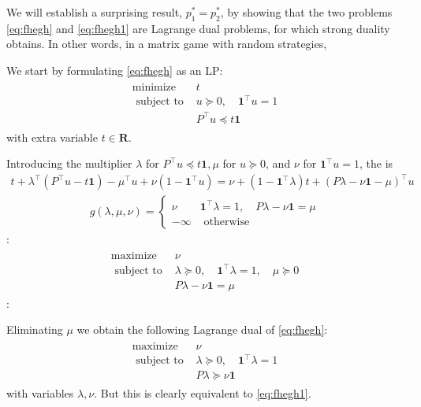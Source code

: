 \documentclass{article}
\begin{document}
We will establish a surprising result, $p_{1}^* =p_{2}^* $, by showing that the two problems \cref{eq:fhegh} and \cref{eq:fhegh1} are Lagrange dual problems, for which strong duality obtains. In other words, in a matrix game with random strategies, 

We start by formulating \cref{eq:fhegh} as an LP:
\begin{align*}
\begin{array}{ll}
\operatorname{minimize} & t \\
\text { subject to } & u \succeq 0, \quad \mathbf{1}^{\top} u=1 \\
& P^{\top} u \preceq t \mathbf{1}
\end{array}
\end{align*}
with extra variable $t \in \mathbf{R}$. 

Introducing the multiplier $\lambda$ for $P^{\top} u \preceq t \mathbf{1}, \mu$ for $u \succeq 0$, and $\nu$ for $\mathbf{1}^{\top} u=1$, the  is
\begin{align*}
t+\lambda^{\top}\left(P^{\top} u-t \mathbf{1}\right)-\mu^{\top} u+\nu\left(1-\mathbf{1}^{\top} u\right)=\nu+\left(1-\mathbf{1}^{\top} \lambda\right) t+(P \lambda-\nu \mathbf{1}-\mu)^{\top} u
\end{align*}
\begin{align*}
g(\lambda, \mu, \nu)= \begin{cases}\nu & \mathbf{1}^{\top} \lambda=1, \quad P \lambda-\nu \mathbf{1}=\mu \\ -\infty & \text { otherwise }\end{cases}
\end{align*}
:
\begin{align*}
\begin{array}{ll}
\operatorname{maximize} & \nu \\
\text { subject to } & \lambda \succeq 0, \quad \mathbf{1}^{\top} \lambda=1, \quad \mu \succeq 0 \\
& P \lambda-\nu \mathbf{1}=\mu
\end{array}
\end{align*}
:

Eliminating $\mu$ we obtain the following Lagrange dual of \cref{eq:fhegh}:
\begin{align*}
\begin{array}{ll}
\operatorname{maximize} & \nu \\
\text { subject to } & \lambda \succeq 0, \quad \mathbf{1}^{\top} \lambda=1 \\
& P \lambda \succeq \nu \mathbf{1}
\end{array}
\end{align*}
with variables $\lambda, \nu$. But this is clearly equivalent to \cref{eq:fhegh1}. 
\end{document}
